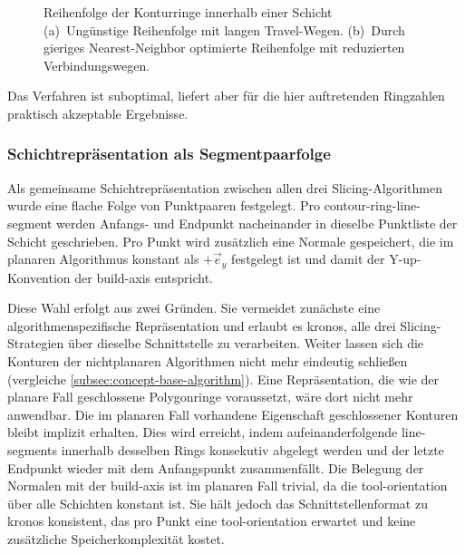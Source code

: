                 \begin{figure}[ht]
                    \centering
                    
                    \caption[Reihenfolgenoptimierung mehrerer Konturringe in einer Schicht]{
                        Reihenfolge der Konturringe innerhalb einer Schicht\\
                        (a)~Ungünstige Reihenfolge mit langen Travel-Wegen.
                        (b)~Durch gieriges Nearest-Neighbor optimierte Reihenfolge mit reduzierten Verbindungswegen.
                    }
                    \label{fig:concept-planar-ring-ordering}
                \end{figure}

                Das Verfahren ist suboptimal, liefert aber für die hier auftretenden Ringzahlen praktisch akzeptable Ergebnisse.

            \subsubsection{Schichtrepräsentation als Segmentpaarfolge}\label{subsubsec:concept-planar-layer-representation}
                Als gemeinsame Schichtrepräsentation zwischen allen drei Slicing-Algorithmen wurde eine flache Folge von Punktpaaren festgelegt.
                Pro \gls{contour-ring}-\gls{line-segment} werden Anfangs- und Endpunkt nacheinander in dieselbe Punktliste der Schicht geschrieben.
                Pro Punkt wird zusätzlich eine Normale gespeichert, die im planaren Algorithmus konstant als $+\vec{e}_y$ festgelegt ist und damit der Y-up-Konvention der \gls{build-axis} entspricht.

                Diese Wahl erfolgt aus zwei Gründen.
                Sie vermeidet zunächste eine algorithmenspezifische Repräsentation und erlaubt es \ac{kronos}, alle drei Slicing-Strategien über dieselbe Schnittstelle zu verarbeiten.
                Weiter lassen sich die Konturen der nichtplanaren Algorithmen nicht mehr eindeutig schließen (vergleiche \cref{subsec:concept-base-algorithm}).
                Eine Repräsentation, die wie der planare Fall geschlossene Polygonringe voraussetzt, wäre dort nicht mehr anwendbar.
                Die im planaren Fall vorhandene Eigenschaft geschlossener Konturen bleibt implizit erhalten.
                Dies wird erreicht, indem aufeinanderfolgende \glspl{line-segment} innerhalb desselben Rings konsekutiv abgelegt werden und der letzte Endpunkt wieder mit dem Anfangspunkt zusammenfällt.
                Die Belegung der Normalen mit der \gls{build-axis} ist im planaren Fall trivial, da die \gls{tool-orientation} über alle Schichten konstant ist.
                Sie hält jedoch das Schnittstellenformat zu \ac{kronos} konsistent, das pro Punkt eine \gls{tool-orientation} erwartet und keine zusätzliche Speicherkomplexität kostet.

